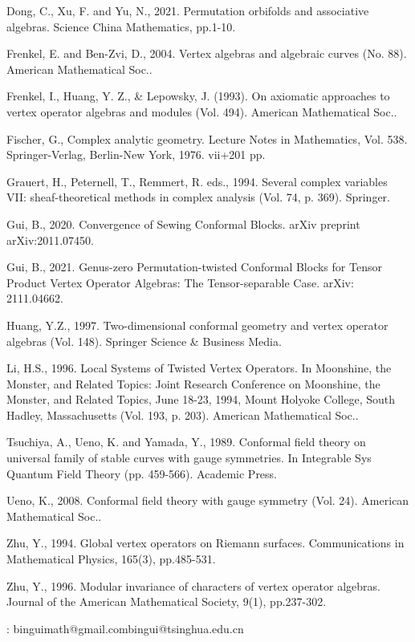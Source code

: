 \documentclass[12pt,a4paper,notitlepage]{article}
\theoremstyle{definition}
\theoremstyle{plain}
\numberwithin{equation}{section}
\begin{document}
\begin{thebibliography}{999999}
Dong, C., Xu, F. and Yu, N., 2021. Permutation orbifolds and associative algebras. Science China Mathematics, pp.1-10.



Frenkel, E. and Ben-Zvi, D., 2004. Vertex algebras and algebraic curves (No. 88). American Mathematical Soc..


Frenkel, I., Huang, Y. Z., \& Lepowsky, J. (1993). On axiomatic approaches to vertex operator algebras and modules (Vol. 494). American Mathematical Soc..




Fischer, G., Complex analytic geometry. Lecture Notes in Mathematics, Vol. 538. Springer-Verlag, Berlin-New York, 1976. vii+201 pp.


Grauert, H., Peternell, T.,  Remmert, R. eds., 1994. Several complex variables VII: sheaf-theoretical methods in complex analysis (Vol. 74, p. 369). Springer.


Gui, B., 2020. Convergence of Sewing Conformal Blocks. arXiv preprint arXiv:2011.07450.


Gui, B., 2021. Genus-zero Permutation-twisted Conformal Blocks for Tensor Product Vertex Operator Algebras: The Tensor-separable Case. arXiv: 2111.04662.



Huang, Y.Z., 1997. Two-dimensional conformal geometry and vertex operator algebras (Vol. 148). Springer Science \& Business Media.

Li, H.S., 1996. Local Systems of Twisted Vertex Operators. In Moonshine, the Monster, and Related Topics: Joint Research Conference on Moonshine, the Monster, and Related Topics, June 18-23, 1994, Mount Holyoke College, South Hadley, Massachusetts (Vol. 193, p. 203). American Mathematical Soc..

Tsuchiya, A., Ueno, K. and Yamada, Y., 1989. Conformal field theory on universal family of stable curves with gauge symmetries. In Integrable Sys Quantum Field Theory (pp. 459-566). Academic Press.

Ueno, K., 2008. Conformal field theory with gauge symmetry (Vol. 24). American Mathematical Soc..


Zhu, Y., 1994. Global vertex operators on Riemann surfaces. Communications in Mathematical Physics, 165(3), pp.485-531.

Zhu, Y., 1996. Modular invariance of characters of vertex operator algebras. Journal of the American Mathematical Society, 9(1), pp.237-302.
		
		
		
		
		
	\end{thebibliography}
	
	: binguimath@gmail.com\qquad bingui@tsinghua.edu.cn
\end{document}
